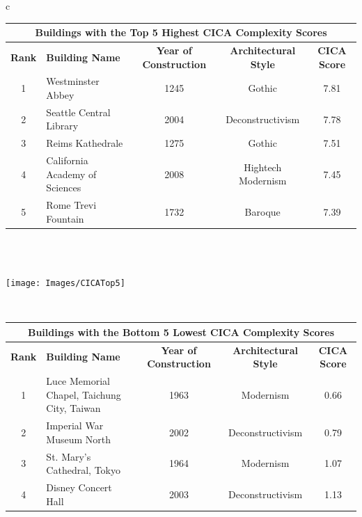 \begin{linenumbers}
\begin{table}[htb]
\begin{tabular}{c}
\begin{minipage}{\textwidth}
        \begin{tabularx}{\linewidth}{c X c c c}
        \toprule
        \multicolumn{5}{c}{\textbf{Buildings with the Top 5 Highest CICA Complexity Scores}} \\
        \hline
        \textbf{Rank} & \textbf{Building Name} & \textbf{Year of Construction} & \textbf{Architectural Style} & \textbf{CICA Score} \\
        \hline
        1 & Westminster Abbey & 1245 & Gothic & 7.81 \\
        2 & Seattle Central Library & 2004 & Deconstructivism & 7.78 \\
        3 & Reims Kathedrale & 1275 & Gothic & 7.51 \\
        4 & California Academy of Sciences & 2008 & Hightech Modernism & 7.45 \\
        5 & Rome Trevi Fountain & 1732 & Baroque & 7.39 \\
        \hline
        \end{tabularx}
    \end{minipage}
    \\
    \\
    \begin{minipage}{\textwidth}
        \centering
        \texttt{[image: Images/CICATop5]}
        \label{fig:CICATop5scores}
    \end{minipage}
    \\
    \begin{minipage}{\textwidth}
        \centering
        \begin{tabularx}{\linewidth}{c X c c c}
        \hline
        \multicolumn{5}{c}{\textbf{Buildings with the Bottom 5 Lowest CICA Complexity Scores}} \\
        \hline
        \textbf{Rank} & \textbf{Building Name} & \textbf{Year of Construction} & \textbf{Architectural Style} & \textbf{CICA Score} \\
        \hline
        1 & Luce Memorial Chapel, Taichung City, Taiwan & 1963 & Modernism & 0.66 \\
        2 & Imperial War Museum North & 2002 & Deconstructivism & 0.79 \\
        3 & St. Mary's Cathedral, Tokyo & 1964 & Modernism & 1.07 \\
        4 & Disney Concert Hall & 2003 & Deconstructivism & 1.13 \\

\end{tabularx}
\end{minipage}
\end{tabular}
\end{table}
\end{linenumbers}
